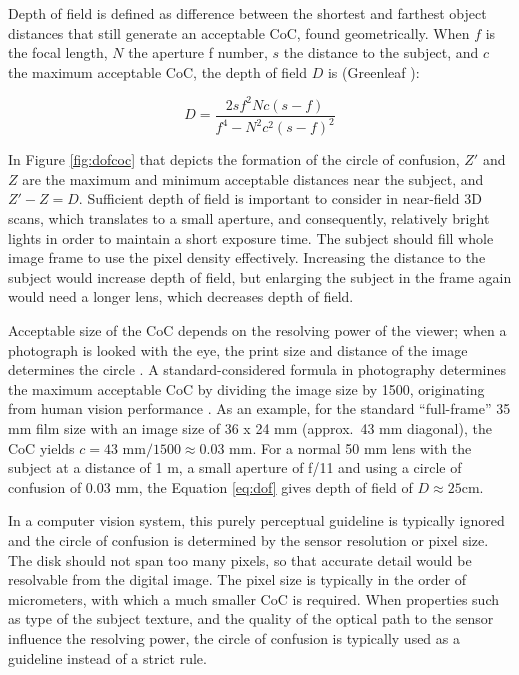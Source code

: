 Depth of field is defined as difference between the shortest and farthest object distances that still generate an acceptable CoC, found geometrically.
When $f$ is the focal length, $N$ the aperture f number, $s$ the distance to the subject, and $c$ the maximum acceptable CoC, the depth of field $D$ is (Greenleaf \cite{greenleaf1950photographic}):

\begin{equation} \label{eq:dof}
	D = \frac{2 s f^2 N c (s - f)} {f^4 - N^2 c^2 (s - f)^2}
\end{equation}



In Figure \ref{fig:dofcoc} that depicts the formation of the circle of confusion, $Z'$ and $Z$ are the maximum and minimum acceptable distances near the subject, and $Z' - Z = D$.
Sufficient depth of field is important to consider in near-field 3D scans, which translates to a small aperture, and consequently, relatively bright lights in order to maintain a short exposure time.
The subject should fill whole image frame to use the pixel density effectively.
Increasing the distance to the subject would increase depth of field, but enlarging the subject in the frame again would need a longer lens, which decreases depth of field.

Acceptable size of the CoC depends on the resolving power of the viewer; when a photograph is looked with the eye, the print size and distance of the image determines the circle \cite{greenleaf1950photographic}.
A standard-considered formula in photography determines the maximum acceptable CoC by dividing the image size by 1500, originating from human vision performance \cite[p. 88, 92]{kingslake1992optics}.
As an example, for the standard ``full-frame'' 35 mm film size with an image size of 36 x 24 mm (approx.\ 43 mm diagonal), the CoC yields $c = 43 \text{ mm} / 1500 \approx 0.03 \text{ mm}$.
For a normal 50 mm lens with the subject at a distance of 1 m, a small aperture of f/11 and using a circle of confusion of 0.03 mm, the Equation \ref{eq:dof} gives depth of field of $D \approx 25 \text{cm}$. 

In a computer vision system, this purely perceptual guideline is typically ignored and the circle of confusion is determined by the sensor resolution or pixel size.
The disk should not span too many pixels, so that accurate detail would be resolvable from the digital image.
The pixel size is typically in the order of micrometers, with which a much smaller CoC is required.
When properties such as type of the subject texture, and the quality of the optical path to the sensor influence the resolving power, the circle of confusion is typically used as a guideline instead of a strict rule.

